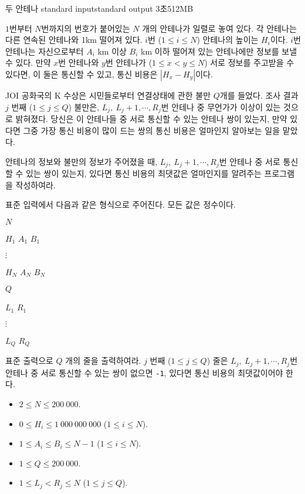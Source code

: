 \begin{problem}{두 안테나}
	{standard input}{standard output}
	{3초}{512MB}{}
	
	$1$번부터 $N$번까지의 번호가 붙어있는 $N$ 개의 안테나가 일렬로 놓여 있다. 각 안테나는 다른 연속된 안테나와 1km 떨어져 있다. $i$번 ($1 \le i \le N$) 안테나의 높이는 $H_i$이다. $i$번 안테나는 자신으로부터 $A_i$ km 이상 $B_i$ km 이하 떨어져 있는 안테나에만 정보를 보낼 수 있다. 만약 $x$번 안테나와 $y$번 안테나가 ($1 \le x < y \le N$) 서로 정보를 주고받을 수 있다면, 이 둘은 통신할 수 있고, 통신 비용은 $|H_x - H_y|$이다.
	
	JOI 공화국의 K 수상은 시민들로부터 연결상태에 관한 불만 $Q$개를 들었다. 조사 결과 $j$ 번째 ($1 \le j \le Q$) 불만은, $L_j, \ L_j +1, \cdots, R_j$번 안테나 중 무언가가 이상이 있는 것으로 밝혀졌다. 당신은 이 안테나들 중 서로 통신할 수 있는 안테나 쌍이 있는지, 만약 있다면 그중 가장 통신 비용이 많이 드는 쌍의 통신 비용은 얼마인지 알아보는 일을 맡았다.
	
	안테나의 정보와 불만의 정보가 주어졌을 때, $L_j, \ L_j +1, \cdots, R_j$번 안테나 중 서로 통신할 수 있는 쌍이 있는지, 있다면 통신 비용의 최댓값은 얼마인지를 알려주는 프로그램을 작성하여라.
	
	\InputFile
	
	표준 입력에서 다음과 같은 형식으로 주어진다. 모든 값은 정수이다.

	$N$
	
	$H_1$ $A_1$ $B_1$
	
	$\vdots$
	
	$H_N$ $A_N$ $B_N$

	$Q$
	
	$L_1$ $R_1$
	
	$\vdots$
	
	$L_Q$ $R_Q$
	
	\OutputFile
	
	표준 출력으로 $Q$ 개의 줄을 출력하여라. $j$ 번째 ($1 \le j \le Q$) 줄은 $L_j, \ L_j +1, \cdots, R_j$번 안테나 중 서로 통신할 수 있는 쌍이 없으면 \texttt{-1}, 있다면 통신 비용의 최댓값이어야 한다.
	
	\Constraints
	
	\begin{itemize}
	
	\item $2 \le N \le 200\ 000$.
	\item $0 \le H_i \le 1\ 000\ 000\ 000$ ($1 \le i \le N$).
	\item $1 \le A_i \le B_i \le N-1$ ($1 \le i \le N$).
	\item $1 \le Q \le 200\ 000$.
	\item $1 \le L_j < R_j \le N$ ($1 \le j \le Q$).
		

\end{itemize}
\end{problem}
